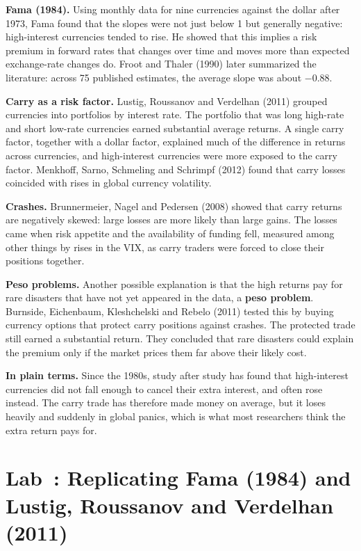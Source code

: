 \textbf{Fama (1984).} Using monthly data for nine currencies against the dollar after 1973, Fama found that the slopes were not just below 1 but generally negative: high-interest currencies tended to rise. He showed that this implies a risk premium in forward rates that changes over time and moves more than expected exchange-rate changes do. Froot and Thaler (1990) later summarized the literature: across 75 published estimates, the average slope was about $-0.88$.

\textbf{Carry as a risk factor.} Lustig, Roussanov and Verdelhan (2011) grouped currencies into portfolios by interest rate. The portfolio that was long high-rate and short low-rate currencies earned substantial average returns. A single carry factor, together with a dollar factor, explained much of the difference in returns across currencies, and high-interest currencies were more exposed to the carry factor. Menkhoff, Sarno, Schmeling and Schrimpf (2012) found that carry losses coincided with rises in global currency volatility.

\textbf{Crashes.} Brunnermeier, Nagel and Pedersen (2008) showed that carry returns are negatively skewed: large losses are more likely than large gains. The losses came when risk appetite and the availability of funding fell, measured among other things by rises in the VIX, as carry traders were forced to close their positions together.

\textbf{Peso problems.} Another possible explanation is that the high returns pay for rare disasters that have not yet appeared in the data, a \textbf{peso problem}. Burnside, Eichenbaum, Kleshchelski and Rebelo (2011) tested this by buying currency options that protect carry positions against crashes. The protected trade still earned a substantial return. They concluded that rare disasters could explain the premium only if the market prices them far above their likely cost.

\noindent\textbf{In plain terms.} Since the 1980s, study after study has found that high-interest currencies did not fall enough to cancel their extra interest, and often rose instead. The carry trade has therefore made money on average, but it loses heavily and suddenly in global panics, which is what most researchers think the extra return pays for.

\section{Lab~\thechapter: Replicating Fama (1984) and Lustig, Roussanov and Verdelhan (2011)}
\label{sec:06-lab}

